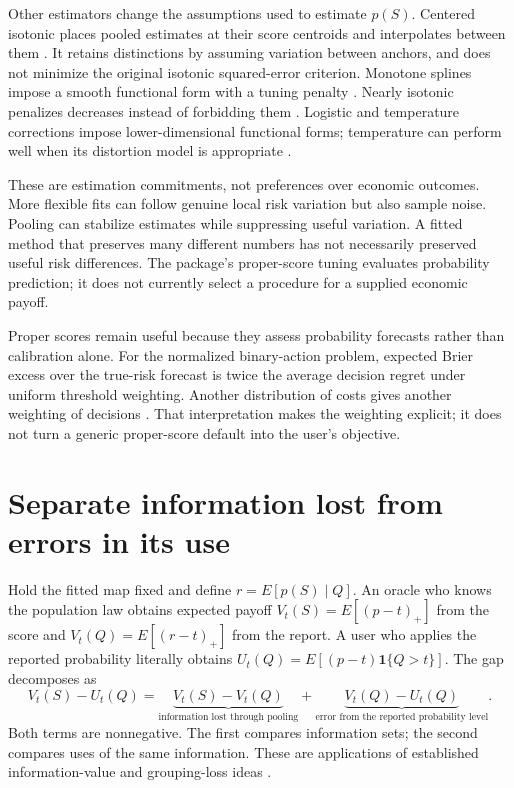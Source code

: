 \documentclass[11pt]{article}
\begin{document}
Other estimators change the assumptions used to estimate $p(S)$. Centered isotonic places pooled estimates at their score centroids and interpolates between them \citep{oron2017centered}. It retains distinctions by assuming variation between anchors, and does not minimize the original isotonic squared-error criterion. Monotone splines impose a smooth functional form with a tuning penalty \citep{ramsay1988monotone}. Nearly isotonic penalizes decreases instead of forbidding them \citep{tibshirani2011nearly}. Logistic and temperature corrections impose lower-dimensional functional forms; temperature can perform well when its distortion model is appropriate \citep{guo2017}.

These are estimation commitments, not preferences over economic outcomes. More flexible fits can follow genuine local risk variation but also sample noise. Pooling can stabilize estimates while suppressing useful variation. A fitted method that preserves many different numbers has not necessarily preserved useful risk differences. The package's proper-score tuning evaluates probability prediction; it does not currently select a procedure for a supplied economic payoff.

Proper scores remain useful because they assess probability forecasts rather than calibration alone. For the normalized binary-action problem, expected Brier excess over the true-risk forecast is twice the average decision regret under uniform threshold weighting. Another distribution of costs gives another weighting of decisions \citep{ehm}. That interpretation makes the weighting explicit; it does not turn a generic proper-score default into the user's objective.

\clearpage
\section{Separate information lost from errors in its use}
Hold the fitted map fixed and define $r=E[p(S)\mid Q]$. An oracle who knows the population law obtains expected payoff $V_t(S)=E[(p-t)_+]$ from the score and $V_t(Q)=E[(r-t)_+]$ from the report. A user who applies the reported probability literally obtains $U_t(Q)=E[(p-t)\mathbf1\{Q>t\}]$. The gap decomposes as
\[
V_t(S)-U_t(Q)
=\underbrace{V_t(S)-V_t(Q)}_{\text{information lost through pooling}}
+\underbrace{V_t(Q)-U_t(Q)}_{\text{error from the reported probability level}}.
\]
Both terms are nonnegative. The first compares information sets; the second compares uses of the same information. These are applications of established information-value and grouping-loss ideas \citep{blackwell1953,tasche,guo2026information}.
\end{document}
